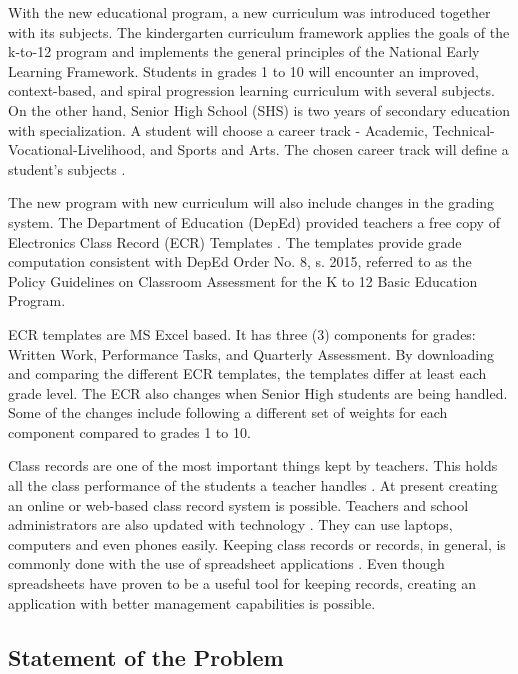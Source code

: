 \documentclass[11pt,a4paper,titlepage]{article}
\begin{document}
With the new educational program, a new curriculum was introduced together with its subjects. The kindergarten curriculum framework applies the goals of the k-to-12 program and implements the general principles of the National Early Learning Framework. Students in grades 1 to 10 will encounter an improved, context-based, and spiral progression learning curriculum with several subjects. On the other hand, Senior High School (SHS) is two years of secondary education with specialization. A student will choose a career track - Academic, Technical-Vocational-Livelihood, and Sports and Arts. The chosen career track will define a student's subjects \cite{Okabe}.

The new program with new curriculum will also include changes in the grading system. The Department of Education (DepEd) provided teachers a free copy of Electronics Class Record (ECR) Templates \cite{depEd}. The templates provide grade computation consistent with DepEd Order No. 8, s. 2015, referred to as the Policy Guidelines on Classroom Assessment for the K to 12 Basic Education Program. 

ECR templates are MS Excel based. It has three (3) components for grades: Written Work, Performance Tasks, and Quarterly Assessment. By downloading and comparing the different ECR templates, the templates differ at least each grade level. The ECR also changes when Senior High students are being handled. Some of the changes include following a different set of weights for each component compared to grades 1 to 10.

Class records are one of the most important things kept by teachers. This holds all the class performance of the students a teacher handles \cite{Dellosa}. At present creating an online or web-based class record system is possible. Teachers and school administrators are also updated with technology \cite{Dellosa}. They can use laptops, computers and even phones easily. Keeping class records or records, in general, is commonly done with the use of spreadsheet applications \cite{Dellosa}. Even though spreadsheets have proven to be a useful tool for keeping records, creating an application with better management capabilities is possible.

\subsection{Statement of the Problem}
\end{document}
